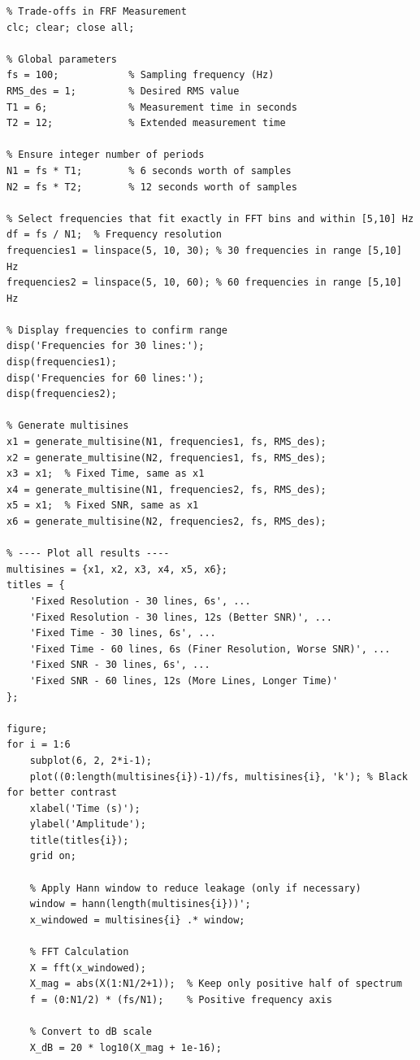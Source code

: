 \documentclass[a4paper,12pt]{article}
\begin{document}
\lstset{language=Matlab, basicstyle=\ttfamily\small, breaklines=true}
\begin{lstlisting}
% Trade-offs in FRF Measurement
clc; clear; close all;

% Global parameters
fs = 100;            % Sampling frequency (Hz)
RMS_des = 1;         % Desired RMS value
T1 = 6;              % Measurement time in seconds
T2 = 12;             % Extended measurement time

% Ensure integer number of periods
N1 = fs * T1;        % 6 seconds worth of samples
N2 = fs * T2;        % 12 seconds worth of samples

% Select frequencies that fit exactly in FFT bins and within [5,10] Hz
df = fs / N1;  % Frequency resolution
frequencies1 = linspace(5, 10, 30); % 30 frequencies in range [5,10] Hz
frequencies2 = linspace(5, 10, 60); % 60 frequencies in range [5,10] Hz

% Display frequencies to confirm range
disp('Frequencies for 30 lines:');
disp(frequencies1);
disp('Frequencies for 60 lines:');
disp(frequencies2);

% Generate multisines
x1 = generate_multisine(N1, frequencies1, fs, RMS_des);
x2 = generate_multisine(N2, frequencies1, fs, RMS_des);
x3 = x1;  % Fixed Time, same as x1
x4 = generate_multisine(N1, frequencies2, fs, RMS_des);
x5 = x1;  % Fixed SNR, same as x1
x6 = generate_multisine(N2, frequencies2, fs, RMS_des);

% ---- Plot all results ----
multisines = {x1, x2, x3, x4, x5, x6};
titles = {
    'Fixed Resolution - 30 lines, 6s', ...
    'Fixed Resolution - 30 lines, 12s (Better SNR)', ...
    'Fixed Time - 30 lines, 6s', ...
    'Fixed Time - 60 lines, 6s (Finer Resolution, Worse SNR)', ...
    'Fixed SNR - 30 lines, 6s', ...
    'Fixed SNR - 60 lines, 12s (More Lines, Longer Time)'
};

figure;
for i = 1:6
    subplot(6, 2, 2*i-1);
    plot((0:length(multisines{i})-1)/fs, multisines{i}, 'k'); % Black for better contrast
    xlabel('Time (s)');
    ylabel('Amplitude');
    title(titles{i});
    grid on;

    % Apply Hann window to reduce leakage (only if necessary)
    window = hann(length(multisines{i}))';
    x_windowed = multisines{i} .* window;

    % FFT Calculation
    X = fft(x_windowed);
    X_mag = abs(X(1:N1/2+1));  % Keep only positive half of spectrum
    f = (0:N1/2) * (fs/N1);    % Positive frequency axis

    % Convert to dB scale
    X_dB = 20 * log10(X_mag + 1e-16); 


\end{lstlisting}
\end{document}
